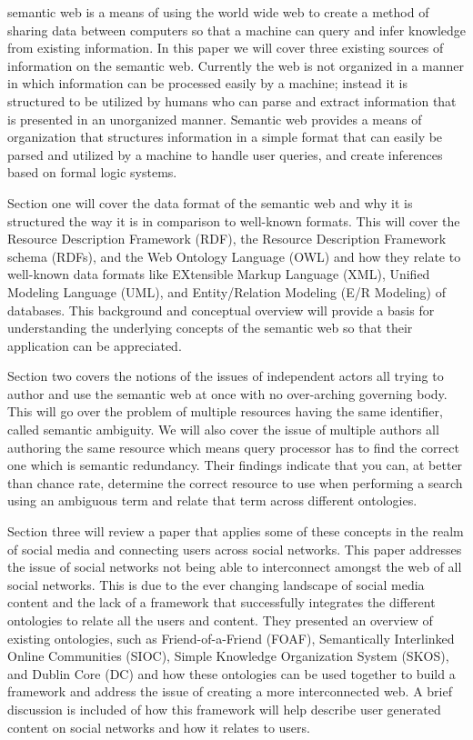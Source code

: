 \documentclass[10pt,journal,compsoc]{IEEEtran}
\begin{document}

 semantic web is a means of using the world wide web to create a method of sharing data between computers so that a machine can query and infer knowledge from existing information. In this paper we will cover three existing sources of information on the semantic web. Currently the web is not organized in a manner in which information can be processed easily by a machine; instead it is structured to be utilized by humans who can parse and extract information that is presented in an unorganized manner. Semantic web provides a means of organization that structures information in a simple format that can easily be parsed and utilized by a machine to handle user queries, and create inferences based on formal logic systems.

Section one will cover the data format of the semantic web and why it is structured the way it is in comparison to well-known formats. This will cover the Resource Description Framework (RDF), the Resource Description Framework schema (RDFs), and the Web Ontology Language (OWL) and how they relate to well-known data formats like EXtensible Markup Language (XML), Unified Modeling Language (UML), and Entity/Relation Modeling (E/R Modeling) of databases. This background and conceptual overview will provide a basis for understanding the underlying concepts of the semantic web so that their application can be appreciated.

Section two covers the notions of the issues of independent actors all trying to author and use the semantic web at once with no over-arching governing body. This will go over the problem of multiple resources having the same identifier, called semantic ambiguity. We will also cover the issue of multiple authors all authoring the same resource which means query processor has to find the correct one which is semantic redundancy. Their findings indicate that you can, at better than chance rate, determine the correct resource to use when performing a search using an ambiguous term and relate that term across different ontologies.

Section three will review a paper that applies some of these concepts in the realm of social media and connecting users across social networks. This paper addresses the issue of social networks not being able to interconnect amongst the web of all social networks. This is due to the ever changing landscape of social media content and the lack of a framework that successfully integrates the different ontologies to relate all the users and content. They presented an overview of existing ontologies, such as Friend-of-a-Friend (FOAF), Semantically Interlinked Online Communities (SIOC), Simple Knowledge Organization System (SKOS), and Dublin Core (DC) and how these ontologies can be used together to build a framework and address the issue of creating a more interconnected web. A brief discussion is included of how this framework will help describe user generated content on social networks and how it relates to users.
\end{document}
